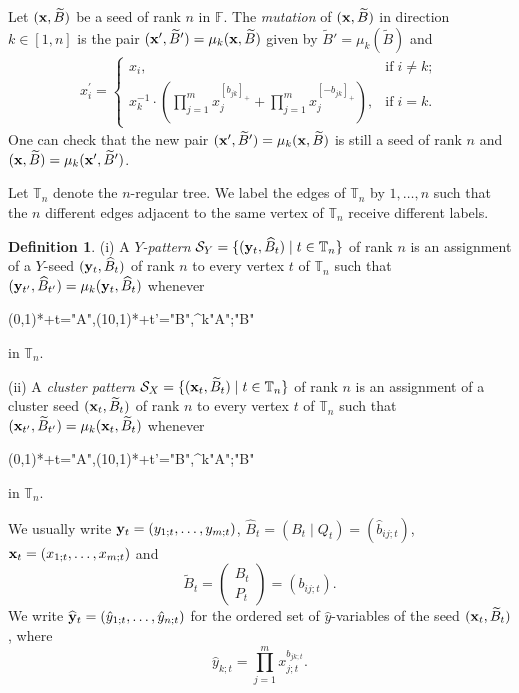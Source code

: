 \documentclass[12pt]{amsart}
\theoremstyle{definition}
\newtheorem{definition}[theorem]{Definition}
\theoremstyle{remark}
\numberwithin{equation}{section}
\def\TT{\mathbb{T}}
\begin{document}
Let  $({\bf x}, \widetilde B)$ be a seed of rank $n$ in $\mathbb F$. The {\em mutation} of $({\bf x}, \widetilde B)$ in direction $k\in[1,n]$ is the pair  $({\bf x}', \widetilde B')=\mu_k({\bf x}, \widetilde B)$ given by $\widetilde B'=\mu_k(\widetilde B)$ and
\begin{eqnarray}
\label{eqn:x-mutation}
 x_i^\prime=\begin{cases}x_i,&
 \text{if}\;i\neq k;\\
 x_k^{-1}\cdot (\prod_{j=1}^mx_j^{[b_{jk}]_+}+\prod_{j=1}^mx_j^{[-b_{jk}]_+}),&\text{if}\;i= k.\end{cases}
\end{eqnarray}
One can check that the new pair  $({\bf x}', \widetilde B')=\mu_k({\bf x}, \widetilde B)$ is still a seed of rank $n$ and $({\bf x}, \widetilde B)=\mu_k({\bf x}', \widetilde B')$.



Let $\mathbb T_n$ denote the $n$-regular tree. We
 label the edges of $\mathbb T_n$ by $1,\ldots, n$ such that the $n$ different edges adjacent to the same vertex of $\mathbb T_n$ receive different labels.

\begin{definition}
(i) A {\em $Y$-pattern} $\mathcal S_Y=\{({\bf y}_t, \widehat B_t)\mid t\in \mathbb T_n\}$ of rank $n$
	is an assignment of a $Y$-seed $({\bf y}_t, \widehat B_t)$ of rank $n$ to
 	every vertex $t$ of $\mathbb T_n$ such that $({\bf y}_{t'}, \widehat B_{t'})=\mu_k({\bf y}_t, \widehat B_t)$ whenever
	\begin{xy}(0,1)*+{t}="A",(10,1)*+{t'}="B",\ar@{-}^k"A";"B" \end{xy} in $\TT_n$.


 (ii) A {\em cluster pattern} $\mathcal S_X=\{({\bf x}_t, \widetilde B_t)\mid t\in \mathbb T_n\}$ of rank $n$
	is an assignment of a cluster seed $({\bf x}_t, \widetilde B_t)$ of rank $n$ to
 	every vertex $t$ of $\mathbb T_n$ such that $({\bf x}_{t'}, \widetilde B_{t'})=\mu_k({\bf x}_t, \widetilde B_t)$ whenever
	\begin{xy}(0,1)*+{t}="A",(10,1)*+{t'}="B",\ar@{-}^k"A";"B" \end{xy} in $\TT_n$.
\end{definition}

We usually write ${\bf y}_t=(y_{1;t},\ldots,y_{m;t})$, $\widehat B_t=(B_t\mid Q_t)=(\hat b_{ij;t})$, ${\bf x}_t=(x_{1;t},\ldots,x_{m;t})$ and \[\widetilde B_t = \begin{pmatrix}
	    B_t\\ P_t
	\end{pmatrix}=(b_{ij;t}).\]
We write $\widehat{\bf y}_t=(\hat y_{1;t},\ldots,\hat y_{n;t})$ for the ordered set of $\hat y$-variables of the seed $({\bf x}_t,\widetilde B_t)$, where $$\hat y_{k;t}=\prod_{j=1}^m x_{j;t}^{b_{jk;t}}.$$
\end{document}
